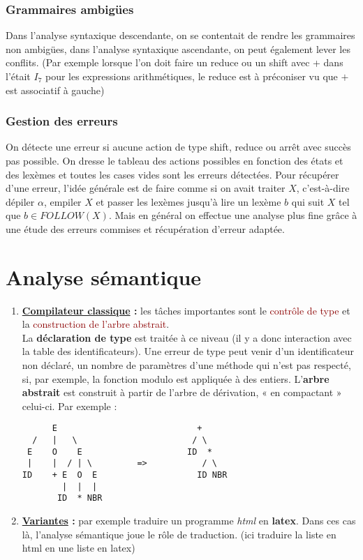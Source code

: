 \documentclass{article}
\newcommand{\red}[1]{\textcolor{darkred}{#1}}
\begin{document}
\subsubsection{Grammaires ambigües}

Dans l'analyse syntaxique descendante, on se contentait de rendre les grammaires non ambigües, dans l'analyse syntaxique ascendante, on peut également lever les conflits. (Par 
exemple lorsque l'on doit faire un reduce ou un shift avec + dans l'était $I_7$ pour les expressions arithmétiques, le reduce est à préconiser vu que $+$ est associatif à gauche)

\subsubsection{Gestion des erreurs}

On détecte une erreur si aucune action de type shift, reduce ou arrêt avec succès pas possible. On dresse le tableau des actions possibles en fonction des états et des lexèmes et 
toutes les cases vides sont les erreurs détectées. Pour récupérer d'une erreur, l'idée générale est de faire comme si on avait traiter $X$, c'est-à-dire dépiler $\alpha$, empiler 
$X$ et passer les lexèmes jusqu'à lire un lexème $b$ qui suit $X$ tel que $b \in FOLLOW(X)$. Mais en général on effectue une analyse plus fine grâce à une étude des erreurs 
commises et récupération d'erreur adaptée.

\section{Analyse sémantique}

\begin{enumerate}
\item \textbf{\underline{Compilateur classique} :} les tâches importantes sont le \red{contrôle de type} et la \red{construction de l'arbre abstrait}.\\
La \textbf{déclaration de type} est traitée à ce niveau (il y a donc interaction avec la table des identificateurs). Une erreur de type peut venir d'un identificateur non déclaré, un 
nombre de paramètres d'une méthode qui n'est pas respecté, si, par exemple, la fonction modulo est appliquée à des entiers. L'\textbf{arbre abstrait} est construit à partir de 
l'arbre de dérivation, « en compactant » celui-ci. Par exemple :
\begin{verbatim}
      E                            +
  /   |   \                       / \
 E    O    E                     ID  *
 |    |  / | \         =>           / \
ID    + E  O  E                    ID NBR
        |  |  |
       ID  * NBR
\end{verbatim}
\item \textbf{\underline{Variantes} :} par exemple traduire un programme \textit{html} en \textbf{latex}. Dans ces cas là, l'analyse sémantique joue le rôle de traduction. (ici 
traduire la liste en html en une liste en latex)
\end{enumerate}
\end{document}
